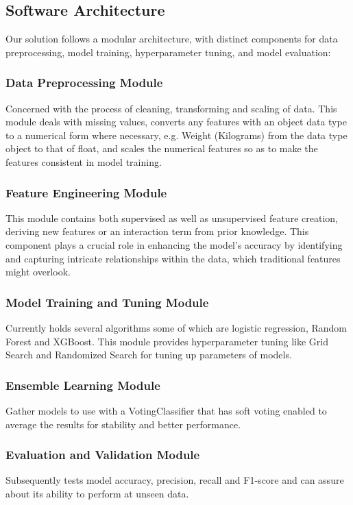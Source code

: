 \documentclass[conference]{IEEEtran}
\begin{document}
\subsection{Software Architecture}
Our solution follows a modular architecture, with distinct components for data preprocessing, model training, hyperparameter tuning, and model evaluation:

\subsubsection{Data Preprocessing Module}
Concerned with the process of cleaning, transforming and scaling of data. This module deals with missing values, converts any features with an object data type to a numerical form where necessary, e.g. Weight (Kilograms) from the data type object to that of float, and scales the numerical features so as to make the features consistent in model training.

\subsubsection{Feature Engineering Module}
This module contains both supervised as well as unsupervised feature creation, deriving new features or an interaction term from prior knowledge. This component plays a crucial role in enhancing the model's accuracy by identifying and capturing intricate relationships within the data, which traditional features might overlook.

\subsubsection{Model Training and Tuning Module}
Currently holds several algorithms some of which are logistic regression, Random Forest and XGBoost. This module provides hyperparameter tuning like Grid Search and Randomized Search for tuning up parameters of models.

\subsubsection{Ensemble Learning Module}
Gather models to use with a VotingClassifier that has soft voting enabled to average the results for stability and better performance.

\subsubsection{Evaluation and Validation Module}
Subsequently tests model accuracy, precision, recall and F1-score and can assure about its ability to perform at unseen data.
\end{document}
